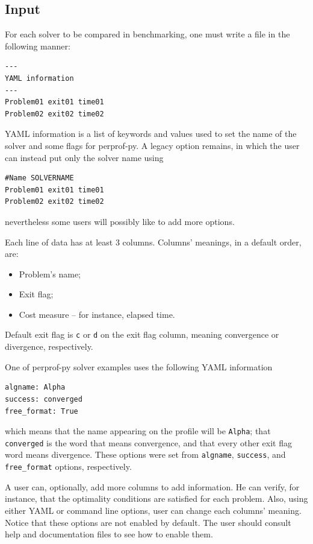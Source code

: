 \subsection*{Input}

    For each solver to be compared in  benchmarking, one must write a file in
    the following manner:

    \begin{verbatim}
---
YAML information
---
Problem01 exit01 time01
Problem02 exit02 time02
    \end{verbatim}

    YAML\cite{url:yaml,url:pyyaml} information is a list of keywords and values used to
    set the name of the solver and some
    flags for perprof-py.
    A legacy option remains, in which the user can instead put only the
    solver name using
\begin{verbatim}
#Name SOLVERNAME
Problem01 exit01 time01
Problem02 exit02 time02
\end{verbatim}
    nevertheless some users  will possibly like to
    add more options.

    Each line of data has at least 3 columns.
    Columns' meanings, in a default order, are:
    \begin{itemize}
      \item Problem's name;
      \item Exit flag;
      \item Cost measure -- for instance, elapsed time.
    \end{itemize}
    Default exit flag is  {\tt c} or {\tt d} on the exit flag
    column, meaning convergence or divergence, respectively.

    One of perprof-py solver examples  uses the following YAML information
\begin{verbatim}
algname: Alpha
success: converged
free_format: True
\end{verbatim}
    which means that the name appearing on the profile will be {\tt Alpha};
    that {\tt converged} is the word that means convergence,
    and that every other exit flag word means divergence.
    These options were set from {\tt algname}, {\tt success}, and {\tt
    free\_format} options, respectively.

    A user can, optionally, add more columns to add information.
    He can verify, for instance, that the optimality conditions are satisfied
    for each problem.
    Also, using  either YAML or command line options,  user can change each
    columns' meaning.
    Notice that these options are not enabled by default. The user should
    consult  help and documentation files to see how to enable them.

